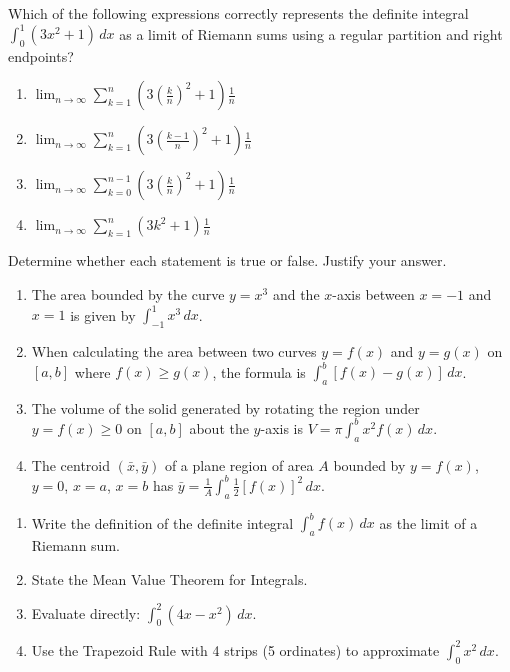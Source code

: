 \documentclass[11pt]{article}
\newcounter{popsec}
\newcounter{popsub}
\newcommand{\courssub}[1]{%
  \stepcounter{popsub}%
  \par\vspace{9pt}\noindent{\popxbold\fontsize{11.5}{13}\selectfont\color{popink}{\color{poporange}\thepopsec.\thepopsub}\hspace{6pt}#1}\par\nopagebreak\vspace{4pt}
}
\begin{document}
\courssub{I check my knowledge}

\begin{exercice}
Which of the following expressions correctly represents the definite integral $\int_0^1 (3x^2 + 1)\,dx$ as a limit of Riemann sums using a regular partition and right endpoints?
\begin{enumerate}
\item $\lim_{n\to\infty} \sum_{k=1}^n \left(3\left(\frac{k}{n}\right)^2 + 1\right)\frac{1}{n}$
\item $\lim_{n\to\infty} \sum_{k=1}^n \left(3\left(\frac{k-1}{n}\right)^2 + 1\right)\frac{1}{n}$
\item $\lim_{n\to\infty} \sum_{k=0}^{n-1} \left(3\left(\frac{k}{n}\right)^2 + 1\right)\frac{1}{n}$
\item $\lim_{n\to\infty} \sum_{k=1}^n \left(3k^2 + 1\right)\frac{1}{n}$
\end{enumerate}
\end{exercice}

\begin{exercice}
Determine whether each statement is true or false. Justify your answer.
\begin{enumerate}
\item The area bounded by the curve $y = x^3$ and the $x$-axis between $x = -1$ and $x = 1$ is given by $\int_{-1}^1 x^3\,dx$.
\item When calculating the area between two curves $y = f(x)$ and $y = g(x)$ on $[a,b]$ where $f(x) \ge g(x)$, the formula is $\int_a^b [f(x) - g(x)]\,dx$.
\item The volume of the solid generated by rotating the region under $y = f(x) \ge 0$ on $[a,b]$ about the $y$-axis is $V = \pi \int_a^b x^2 f(x)\,dx$.
\item The centroid $(\bar{x}, \bar{y})$ of a plane region of area $A$ bounded by $y = f(x)$, $y = 0$, $x = a$, $x = b$ has $\bar{y} = \frac{1}{A}\int_a^b \frac{1}{2}[f(x)]^2\,dx$.
\end{enumerate}
\end{exercice}

\begin{exercice}
\begin{enumerate}
\item Write the definition of the definite integral $\int_a^b f(x)\,dx$ as the limit of a Riemann sum.
\item State the Mean Value Theorem for Integrals.
\item Evaluate directly: $\int_0^2 (4x - x^2)\,dx$.
\item Use the Trapezoid Rule with 4 strips (5 ordinates) to approximate $\int_0^2 x^2\,dx$.
\end{enumerate}
\end{exercice}
\end{document}

